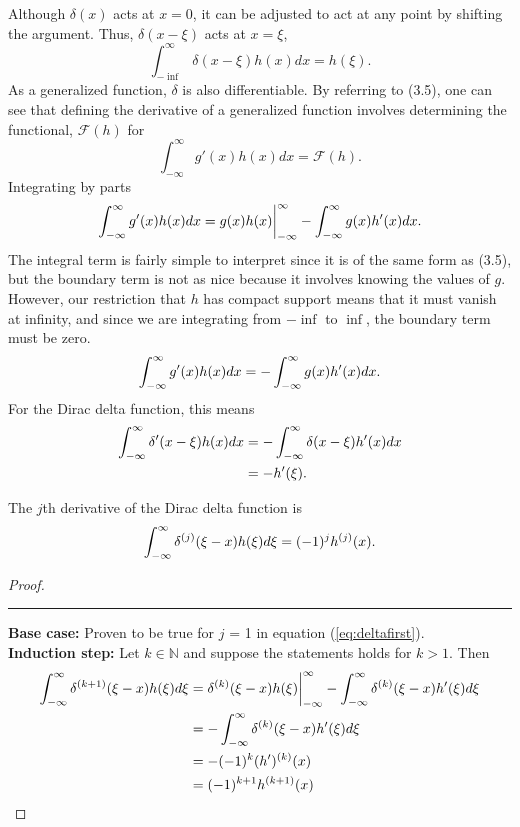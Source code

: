 Although \(\delta(x)\) acts at \(x=0\), it can be adjusted to act at any point by shifting the argument. Thus, \(\delta(x-\xi)\) acts at \(x=\xi\),
\begin{equation}
    \int_{-\inf}^{\infty} \delta(x-\xi)h(x)dx = h(\xi).
\end{equation}
As a generalized function, \(\delta\) is also differentiable. By referring to (3.5), one can see that defining the derivative of a generalized function involves determining the functional, \(\mathcal{F}(h)\) for
\begin{equation}
    \int_{-\infty}^{\infty} g'(x)h(x) dx= \mathcal{F}(h).
\end{equation}
Integrating by parts
\begin{equation}
    \int_{-\infty}^{\infty} g'(x)h(x)dx = g(x)h(x)\biggr\rvert_{-\infty}^{\infty} - \int_{-\infty}^{\infty} g(x)h'(x)dx.
\end{equation}
The integral term is fairly simple to interpret since it is of the same form as (3.5), but the boundary term is not as nice because it involves knowing the values of \(g\). However, our restriction that \(h\) has compact support means that it must vanish at infinity, and since we are integrating from \(-\inf\) to \(\inf\), the boundary term must be zero.
\begin{equation}
    \int_{-\infty}^{\infty} g'(x)h(x)dx = -\int_{-\infty}^{\infty} g(x)h'(x)dx.
\end{equation}
For the Dirac delta function, this means
\begin{equation}
    \begin{split} \label{eq:deltafirst}
        \int_{-\infty}^{\infty} \delta'(x-\xi)h(x)dx &= -\int_{-\infty}^{\infty}\delta(x-\xi)h'(x)dx\\
        &=-h'(\xi).
    \end{split}
\end{equation}


\begin{theorem} \label{th:deltad}
    The \(j\)th derivative of the Dirac delta function is
    \begin{equation}
         \int_{-\infty}^{\infty} \delta^{(j)}(\xi-x)h(\xi)d\xi = (-1)^jh^{(j)}(x).
    \end{equation}
\end{theorem}
\begin{proof}
    \noindent\rule{\textwidth}{1pt}
    \textbf{Base case:} Proven to be true for \(j\) = 1 in equation (\ref{eq:deltafirst}).\\
    \textbf{Induction step:} Let \(k \in \mathbb{N}\) and suppose the statements holds for \(k>1\). Then
    \begin{align*}
        \int_{-\infty}^{\infty} \delta^{(k+1)}(\xi-x)h(\xi)d\xi &= \delta^{(k)}(\xi-x)h(\xi)\biggr\rvert_{-\infty}^{\infty}-\int_{-\infty}^{\infty} \delta^{(k)}(\xi-x)h'(\xi)d\xi\\
        &=-\int_{-\infty}^{\infty} \delta^{(k)}(\xi-x)h'(\xi)d\xi\\
        &=-(-1)^{k}(h')^{(k)}(x)\\
        &=(-1)^{k+1}h^{(k+1)}(x)
    \end{align*}
\end{proof}

